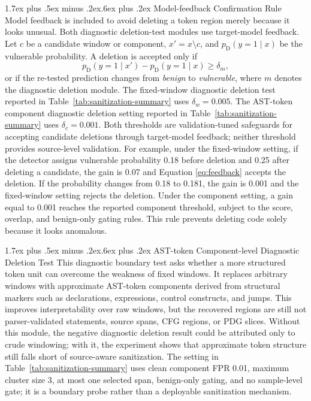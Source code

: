 \documentclass[letterpaper,twocolumn,10pt,twoside]{article}
\makeatletter
\renewcommand\subsection{\@startsection{subsection}{2}{\z@}%
  {1.7ex plus .5ex minus .2ex}{.6ex plus .2ex}%
  {\normalfont\normalsize\bfseries}}
\makeatother
\begin{document}
\subsection{Model-feedback Confirmation Rule}
Model feedback is included to avoid deleting a token region merely because it looks unusual. Both diagnostic deletion-test modules use target-model feedback. Let $c$ be a candidate window or component, $x' = x \setminus c$, and $p_{\mathrm{D}}(y = 1 \mid x)$ be the vulnerable probability. A deletion is accepted only if
\begin{equation}
  p_{\mathrm{D}}(y = 1 \mid x') - p_{\mathrm{D}}(y = 1 \mid x) \ge \delta_m,
  \label{eq:feedback}
\end{equation}
or if the re-tested prediction changes from \textit{benign} to \textit{vulnerable}, where $m$ denotes the diagnostic deletion module. The fixed-window diagnostic deletion test reported in Table~\ref{tab:sanitization-summary} uses $\delta_w = 0.005$. The AST-token component diagnostic deletion setting reported in Table~\ref{tab:sanitization-summary} uses $\delta_c = 0.001$. Both thresholds are validation-tuned safeguards for accepting candidate deletions through target-model feedback; neither threshold provides source-level validation. For example, under the fixed-window setting, if the detector assigns vulnerable probability 0.18 before deletion and 0.25 after deleting a candidate, the gain is 0.07 and Equation \eqref{eq:feedback} accepts the deletion. If the probability changes from 0.18 to 0.181, the gain is 0.001 and the fixed-window setting rejects the deletion. Under the component setting, a gain equal to 0.001 reaches the reported component threshold, subject to the score, overlap, and benign-only gating rules. This rule prevents deleting code solely because it looks anomalous.

\subsection{AST-token Component-level Diagnostic Deletion Test}
This diagnostic boundary test asks whether a more structured token unit can overcome the weakness of fixed windows. It replaces arbitrary windows with approximate AST-token components derived from structural markers such as declarations, expressions, control constructs, and jumps. This improves interpretability over raw windows, but the recovered regions are still not parser-validated statements, source spans, CFG regions, or PDG slices. Without this module, the negative diagnostic deletion result could be attributed only to crude windowing; with it, the experiment shows that approximate token structure still falls short of source-aware sanitization. The setting in Table~\ref{tab:sanitization-summary} uses clean component FPR 0.01, maximum cluster size 3, at most one selected span, benign-only gating, and no sample-level gate; it is a boundary probe rather than a deployable sanitization mechanism.
\end{document}
